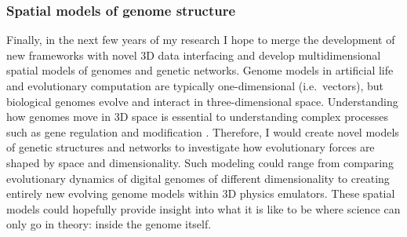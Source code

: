 \subsubsection{Spatial models of genome structure}

Finally, in the next few years of my research I hope to merge the development of new frameworks with novel 3D data interfacing and develop multidimensional spatial models of genomes and genetic networks.
Genome models in artificial life and evolutionary computation are typically one-dimensional (i.e.~vectors), but biological genomes evolve and interact in three-dimensional space. 
Understanding how genomes move in 3D space is essential to understanding complex processes such as gene regulation and modification \citep{mendizabal_epigenetics_2014, sotelo-silveira_entering_2018}.
Therefore, I would create novel models of genetic structures and networks to investigate how evolutionary forces are shaped by space and dimensionality.
Such modeling could range from comparing evolutionary dynamics of digital genomes of different dimensionality to creating entirely new evolving genome models within 3D physics emulators. 
These spatial models could hopefully provide insight into what it is like to be where science can only go in theory: inside the genome itself.